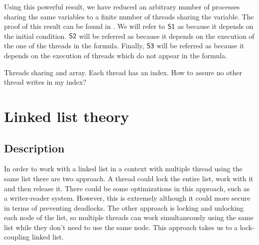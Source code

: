 Using this powerful result, we have reduced an arbitrary number of processes sharing the same variables to a finite number of threads sharing the variable. 
%
The proof of this result can be found in .
%
We will refer to $\mathsf{S1}$ as  because it depends on the initial condition.
%
$\mathsf{S2}$ will be referred as  because it depends on the execution of the one of the threads in the formula.
%
Finally, $\mathsf{S3}$ will be referred as  because it depends on the execution of threads which do not appear in the formula. 


\begin{example}
Threads sharing and array. Each thread has an index. How to assure no other thread writes in my index?
\end{example}








\section{Linked list theory}

\subsection{Description}

In order to work with a linked list in a context with multiple thread using the same list 
there are two approach. 
%
A thread could lock the entire list, work with it and then release it. 
%
There could be some optimizations in this approach, such as a writer-reader system.
%
However, this is extremely  although it could more secure in terms of preventing deadlocks.
%
The other approach is locking and unlocking each node of the list, so multiple threads can work simultaneously using the same list while they don't need to use the same node.
%
This approach takes us to a lock-coupling linked list.



